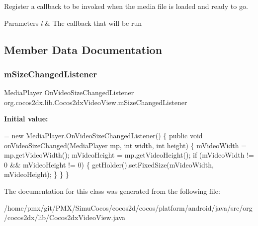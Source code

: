 Register a callback to be invoked when the media file is loaded and ready to go.


\begin{DoxyParams}{Parameters}
{\em l} & The callback that will be run \\
\hline
\end{DoxyParams}


\subsection{Member Data Documentation}
\mbox{\label{classorg_1_1cocos2dx_1_1lib_1_1Cocos2dxVideoView_a545f755a986418576aa4b2a598040643}} 
\subsubsection{\texorpdfstring{m\+Size\+Changed\+Listener}{mSizeChangedListener}}
{\footnotesize\ttfamily Media\+Player On\+Video\+Size\+Changed\+Listener org.\+cocos2dx.\+lib.\+Cocos2dx\+Video\+View.\+m\+Size\+Changed\+Listener\hspace{0.3cm}{\ttfamily [protected]}}

{\bfseries Initial value\+:}
\begin{DoxyCode}
=
        \textcolor{keyword}{new} MediaPlayer.OnVideoSizeChangedListener() \{
            \textcolor{keyword}{public} \textcolor{keywordtype}{void} onVideoSizeChanged(MediaPlayer mp, \textcolor{keywordtype}{int} width, \textcolor{keywordtype}{int} height) \{
                mVideoWidth = mp.getVideoWidth();
                mVideoHeight = mp.getVideoHeight();
                \textcolor{keywordflow}{if} (mVideoWidth != 0 && mVideoHeight != 0) \{
                    getHolder().setFixedSize(mVideoWidth, mVideoHeight);
                \}
            \}
    \}
\end{DoxyCode}


The documentation for this class was generated from the following file\+:\begin{DoxyCompactItemize}
\item 
/home/pmx/git/\+P\+M\+X/\+Simu\+Cocos/cocos2d/cocos/platform/android/java/src/org/cocos2dx/lib/Cocos2dx\+Video\+View.\+java\end{DoxyCompactItemize}
